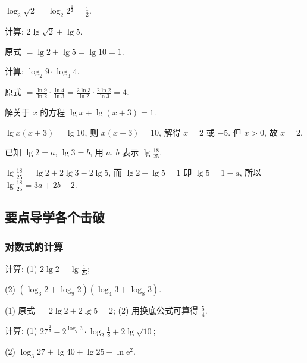   \beginsolution
    $\log_2 \sqrt2 = \log_2 2^{\frac12}= \frac12$.
  \endsolution
  
  \begin{exercise}
    计算: $2\lg\sqrt2 +\lg5$.
  \end{exercise}

  \beginsolution
    原式 $= \lg2+\lg5 =\lg10=1$.
  \endsolution
  
  \begin{exercise}
    计算: $\log_2 9\cdot \log_3 4$.
  \end{exercise}

  \beginsolution
    原式 $=\frac{\ln9}{\ln2}\cdot \frac{\ln4}{\ln3}
      =\frac{2\ln3}{\ln2}\cdot \frac{2\ln2}{\ln3}= 4$.
  \endsolution
  
  \begin{exercise}
    解关于 $x$ 的方程 $\lg x+\lg(x+3)=1$.
  \end{exercise}

  \beginsolution
    $\lg x(x+3)=\lg 10$, 则 $x(x+3)=10$, 
    解得 $x=2$ 或 $-5$. 但 $x>0$, 故 $x=2$.
  \endsolution
  
  \begin{exercise}
    已知 $\lg2=a$, $\lg3=b$, 用 $a$, $b$ 表示 $\lg\frac{18}{25}$.
  \end{exercise}

  \beginsolution
    $\lg\frac{18}{25}= \lg2+2\lg3-2\lg5$, 
    而 $\lg2+\lg5=1$ 即 $\lg5=1-a$, 所以 $\lg\frac{18}{25}=3a+2b-2$.
  \endsolution
  
  \subsection{要点导学\quad 各个击破}
  \subsubsection{对数式的计算}
  \begin{example}
    计算: (1)  $2\lg2-\lg\frac1{25}$;

    (2) $(\log_3 2+\log_9 2)(\log_4 3+\log_8 3)$.
  \end{example}

  \beginsolution
    (1) 原式 $=2\lg2+2\lg5=2$; (2) 用换底公式可算得 $\frac54$.
  \endsolution
  
  \lianxi
  \begin{exercise}[s]
    计算: (1) $27^{\frac23}- 2^{\log_2 3}\cdot \log_2{\frac18}+ 2\lg\sqrt{10}$;
    
    (2) $\log_3 27+ \lg40+ \lg 25- \ln\mathrm{e}^2$.
  \end{exercise}

